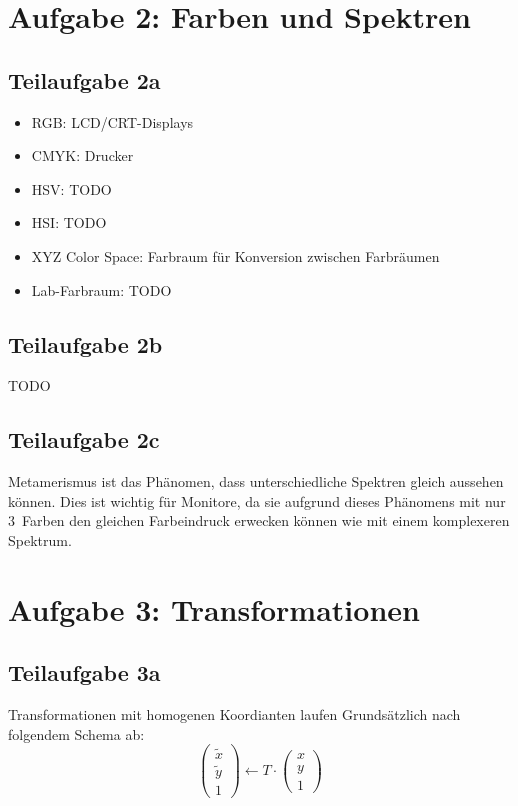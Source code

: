 \documentclass[a4paper]{scrartcl}
\begin{document}
\section*{Aufgabe 2: Farben und Spektren}
\subsection*{Teilaufgabe 2a}

\begin{itemize}
    \item RGB: LCD/CRT-Displays
    \item CMYK: Drucker
    \item HSV: TODO
    \item HSI: TODO
    \item XYZ Color Space: Farbraum für Konversion zwischen Farbräumen
    \item Lab-Farbraum: TODO
\end{itemize}

\subsection*{Teilaufgabe 2b}
TODO

\subsection*{Teilaufgabe 2c}
Metamerismus ist das Phänomen, dass unterschiedliche Spektren gleich aussehen
können. Dies ist wichtig für Monitore, da sie aufgrund dieses Phänomens mit nur
3~Farben den gleichen Farbeindruck erwecken können wie mit einem komplexeren
Spektrum.

\section*{Aufgabe 3: Transformationen}
\subsection*{Teilaufgabe 3a}
Transformationen mit homogenen Koordianten laufen Grundsätzlich nach folgendem Schema ab:
\[\begin{pmatrix}\tilde{x}\\ \tilde{y} \\ 1\end{pmatrix} \gets T \cdot \begin{pmatrix}x\\ y \\ 1\end{pmatrix}\]
\end{document}
